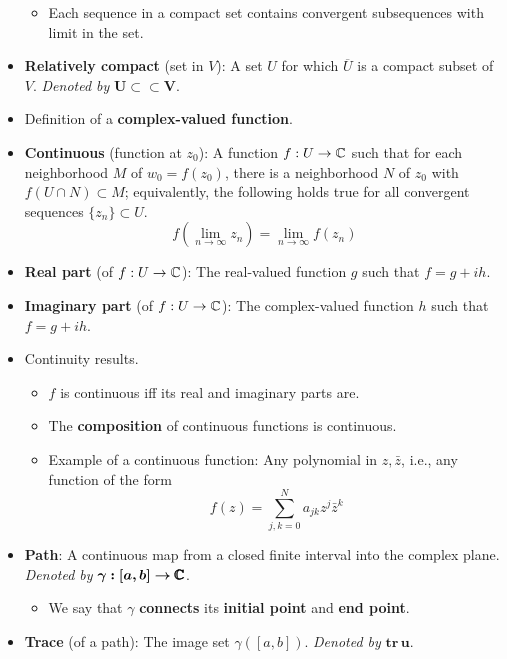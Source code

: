 \documentclass[../notes.tex]{subfiles}
\begin{document}
\begin{itemize}
    \begin{itemize}
        \item Each sequence in a compact set contains convergent subsequences with limit in the set.
    \end{itemize}
    \item \textbf{Relatively compact} (set in $V$): A set $U$ for which $\overline{U}$ is a compact subset of $V$. \emph{Denoted by} $\bm{U\subset\subset V}$.
    \item Definition of a \textbf{complex-valued function}.
    \item \textbf{Continuous} (function at $z_0$): A function $f:U\to\mathbb{C}$ such that for each neighborhood $M$ of $w_0=f(z_0)$, there is a neighborhood $N$ of $z_0$ with $f(U\cap N)\subset M$; equivalently, the following holds true for all convergent sequences $\{z_n\}\subset U$.
    \begin{equation*}
        f\left( \lim_{n\to\infty}z_n \right) = \lim_{n\to\infty}f(z_n)
    \end{equation*}
    \item \textbf{Real part} (of $f:U\to\mathbb{C}$): The real-valued function $g$ such that $f=g+ih$.
    \item \textbf{Imaginary part} (of $f:U\to\mathbb{C}$): The complex-valued function $h$ such that $f=g+ih$.
    \item Continuity results.
    \begin{itemize}
        \item $f$ is continuous iff its real and imaginary parts are.
        \item The \textbf{composition} of continuous functions is continuous.
        \item Example of a continuous function: Any polynomial in $z,\bar{z}$, i.e., any function of the form
        \begin{equation*}
            f(z) = \sum_{j,k=0}^Na_{jk}z^j\bar{z}^k
        \end{equation*}
    \end{itemize}
    \item \textbf{Path}: A continuous map from a closed finite interval into the complex plane. \emph{Denoted by} $\bm{\gamma:[a,b]\to\pmb{\mathbb{C}}}$.
    \begin{itemize}
        \item We say that $\gamma$ \textbf{connects} its \textbf{initial point} and \textbf{end point}.
    \end{itemize}
    \item \textbf{Trace} (of a path): The image set $\gamma([a,b])$. \emph{Denoted by} $\bm{\textbf{tr}\,u}$.

\end{itemize}
\end{document}
